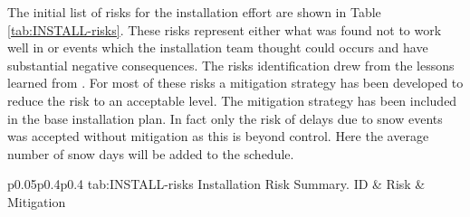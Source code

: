 The initial list of risks for the installation effort are shown in Table \ref{tab:INSTALL-risks}. These risks represent either what was found not to work well in  or events which the installation team thought could occurs and have substantial negative consequences. The risks identification drew from the lessons learned from \cite{bib:docdb8255}. For most of these risks a mitigation strategy has been developed to reduce the risk to an acceptable level. The mitigation strategy has been included in the base installation plan. In fact only the risk of delays due to snow events was accepted without mitigation as this is beyond control. Here the average number of snow days will be added to the schedule.

\begin{dunetable}
{p{0.05\textwidth}p{0.4\textwidth}p{0.4\textwidth}}
{tab:INSTALL-risks}
{Installation Risk Summary.}   
ID & Risk  & Mitigation\\ \toprowrule


\end{dunetable}

